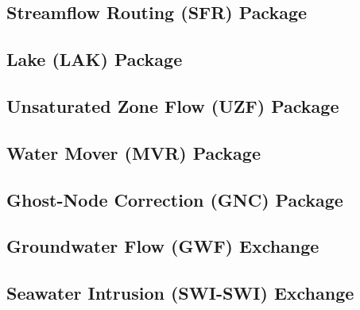 \subsection{Streamflow Routing (SFR) Package}


\newpage
\subsection{Lake (LAK) Package} \label{sec:lakpak}


\newpage
\subsection{Unsaturated Zone Flow (UZF) Package}


\newpage
\subsection{Water Mover (MVR) Package}


\newpage
\subsection{Ghost-Node Correction (GNC) Package}


\newpage
\subsection{Groundwater Flow (GWF) Exchange}


\newpage
\subsection{Seawater Intrusion (SWI-SWI) Exchange}


